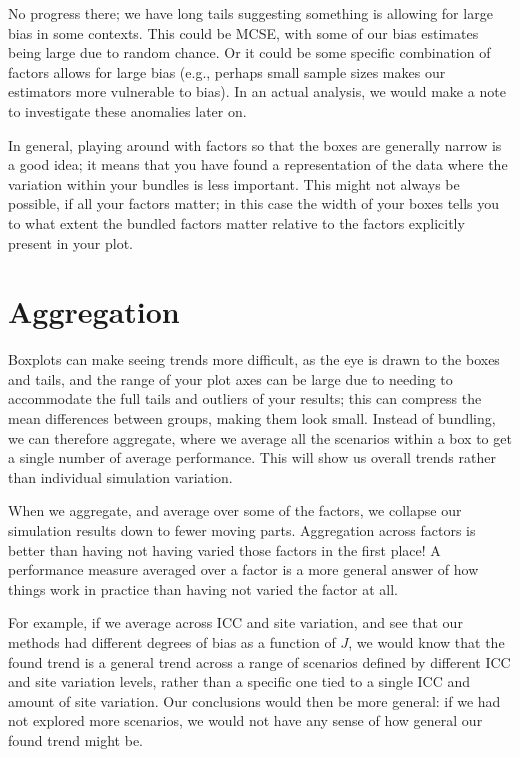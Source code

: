 \documentclass[
]{book}
\begin{document}
No progress there; we have long tails suggesting something is allowing for large bias in some contexts.
This could be MCSE, with some of our bias estimates being large due to random chance.
Or it could be some specific combination of factors allows for large bias (e.g., perhaps small sample sizes makes our estimators more vulnerable to bias).
In an actual analysis, we would make a note to investigate these anomalies later on.

In general, playing around with factors so that the boxes are generally narrow is a good idea; it means that you have found a representation of the data where the variation within your bundles is less important.
This might not always be possible, if all your factors matter; in this case the width of your boxes tells you to what extent the bundled factors matter relative to the factors explicitly present in your plot.

\section{Aggregation}\label{aggregation}

Boxplots can make seeing trends more difficult, as the eye is drawn to the boxes and tails, and the range of your plot axes can be large due to needing to accommodate the full tails and outliers of your results; this can compress the mean differences between groups, making them look small.
Instead of bundling, we can therefore aggregate, where we average all the scenarios within a box to get a single number of average performance.
This will show us overall trends rather than individual simulation variation.

When we aggregate, and average over some of the factors, we collapse our simulation results down to fewer moving parts.
Aggregation across factors is better than having not having varied those factors in the first place!
A performance measure averaged over a factor is a more general answer of how things work in practice than having not varied the factor at all.

For example, if we average across ICC and site variation, and see that our methods had different degrees of bias as a function of \(J\), we would know that the found trend is a general trend across a range of scenarios defined by different ICC and site variation levels, rather than a specific one tied to a single ICC and amount of site variation.
Our conclusions would then be more general: if we had not explored more scenarios, we would not have any sense of how general our found trend might be.
\end{document}
